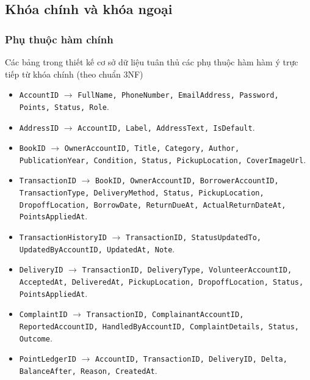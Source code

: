 \subsection{Khóa chính và khóa ngoại}

\subsubsection{Phụ thuộc hàm chính}
Các bảng trong thiết kế cơ sở dữ liệu tuân thủ các phụ thuộc hàm hàm ý trực tiếp từ khóa chính (theo chuẩn 3NF)
\begin{itemize}
    \item \texttt{AccountID} $\rightarrow$ \texttt{FullName, PhoneNumber, EmailAddress, Password, Points, Status, Role}.
    \item \texttt{AddressID} $\rightarrow$ \texttt{AccountID, Label, AddressText, IsDefault}.
    \item \texttt{BookID} $\rightarrow$ \texttt{OwnerAccountID, Title, Category, Author, PublicationYear, Condition, Status, PickupLocation, CoverImageUrl}.
    \item \texttt{TransactionID} $\rightarrow$ \texttt{BookID, OwnerAccountID, BorrowerAccountID, TransactionType, DeliveryMethod, Status, PickupLocation, DropoffLocation, BorrowDate, ReturnDueAt, ActualReturnDateAt, PointsAppliedAt}.
    \item \texttt{TransactionHistoryID} $\rightarrow$ \texttt{TransactionID, StatusUpdatedTo, UpdatedByAccountID, UpdatedAt, Note}.
    \item \texttt{DeliveryID} $\rightarrow$ \texttt{TransactionID, DeliveryType, VolunteerAccountID, AcceptedAt, DeliveredAt, PickupLocation, DropoffLocation, Status, PointsAppliedAt}.
    \item \texttt{ComplaintID} $\rightarrow$ \texttt{TransactionID, ComplainantAccountID, ReportedAccountID, HandledByAccountID, ComplaintDetails, Status, Outcome}.
    \item \texttt{PointLedgerID} $\rightarrow$ \texttt{AccountID, TransactionID, DeliveryID, Delta, BalanceAfter, Reason, CreatedAt}.
\end{itemize}


